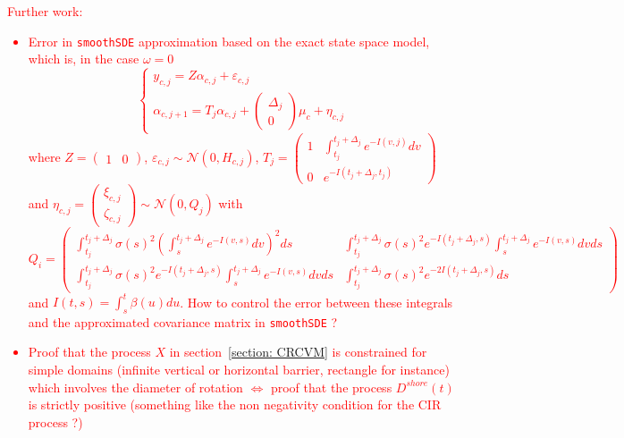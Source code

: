\documentclass[11pt]{article}
\newcommand {\1}{\mathbb{1}}
\begin{document}
\textcolor{red}{Further work: 
\begin{itemize}
	\item Error in \texttt{smoothSDE} approximation based on the exact state space model, which is, in the case $\omega=0$ 
	\[
	\left\{
	\begin{array}{l}
		y_{c,j}=Z\alpha_{c,j}+\varepsilon_{c,j} \\
		\alpha_{c,j+1}=T_j \alpha_{c,j}+\begin{pmatrix} \Delta_j \\ 0 \end{pmatrix} \mu_c+\eta_{c,j} 
	\end{array}
	\right.
	\]
	where $Z=\begin{pmatrix} 1 & 0 \end{pmatrix}$, $\varepsilon_{c,j} \sim \mathcal{N}(0,H_{c,j})$, 
	$T_j=\begin{pmatrix} 
		1 & \int_{t_j}^{t_j+\Delta_j} e^{-I(v,j)}dv \\
		0 & e^{-I(t_j+\Delta_j,t_j)}
	\end{pmatrix}$  and $\eta_{c,j}=\begin{pmatrix} \xi_{c,j} \\ \zeta_{c,j} \end{pmatrix} \sim \mathcal{N}(0,Q_j)$ with
	\[Q_i=\begin{pmatrix}
		\int_{t_j}^{t_j+\Delta_j} \sigma(s)^2 \left(\int_{s}^{t_j+\Delta_j} e^{-I(v,s)} dv\right)^2 ds
		& \int_{t_j}^{t_j+\Delta_j} \sigma(s)^2e^{-I(t_j+\Delta_j,s)} \int_s^{t_j+\Delta_j} e^{-I(v,s)} dv ds \\
		\int_{t_j}^{t_j+\Delta_j} \sigma(s)^2e^{-I(t_j+\Delta_j,s)} \int_s^{t_j+\Delta_j} e^{-I(v,s)} dv ds & \int_{t_j}^{t_j+\Delta_j} \sigma(s)^2 e^{-2I(t_j+\Delta_j,s)} ds
	\end{pmatrix}
	\]
	and $I(t,s)=\int_{s}^{t} \beta(u) du$.
	How to control the error between these integrals and the approximated covariance matrix in \texttt{smoothSDE} ?
	\item Proof that the process $X$ in section~\ref{section: CRCVM} is constrained for simple domains (infinite vertical or horizontal barrier, rectangle for instance) which involves the diameter of rotation $\Leftrightarrow$ proof that the process $D^{shore}(t)$ is strictly positive (something like the non negativity condition for the CIR process ?)
\end{itemize}}
\end{document}
